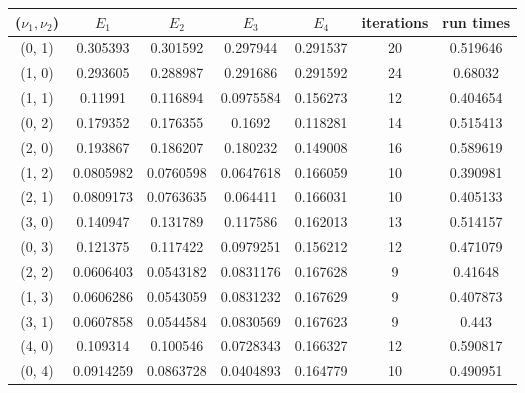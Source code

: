 \documentclass[12pt]{article}
\begin{document}
\begin{center}
\begin{tabular}{||c|cccc|c | c||}
\hline \hline
 ($\nu_1, \nu_2$)   & $E_1$ & $E_2$ &  $E_3$ & $E_4$ &   iterations & run times\\
\hline \hline
  \color{red}(0, 1)   &   \color{red}0.305393  &  \color{red}0.301592  &  \color{red}0.297944  &   \color{red}0.291537 &   \color{red}20 & \color{red}0.519646\\
 (1, 0)   &  0.293605  &      0.288987  &      0.291686  &       0.291592 &           24 & 0.68032 \\ \hline
  \color{red}(1, 1)   &   \color{red}0.11991   &  \color{red}0.116894  &  \color{red}0.0975584 &  \color{red}0.156273 &  \color{red}12 & \color{red}0.404654\\
 (0, 2)   &  0.179352  &      0.176355  &      0.1692    &       0.118281 &           14 & 0.515413 \\ 
 (2, 0)   &  0.193867  &      0.186207  &      0.180232  &       0.149008 &           16 & 0.589619 \\ \hline
  \color{red}(1, 2)   &   \color{red}0.0805982 &       \color{red}0.0760598 &      0.0647618 &       0.166059 &    \color{red}10 & \color{red}0.390981\\
  \color{red}(2, 1)   &  0.0809173 &      0.0763635 &       \color{red}0.064411  &        \color{red}0.166031 &   \color{red}10 & 0.405133 \\
 (3, 0)   &  0.140947  &      0.131789  &      0.117586  &       0.162013 &           13 & 0.514157 \\
 (0, 3)   &  0.121375  &      0.117422  &      0.0979251 &       0.156212 &           12 & 0.471079 \\ \hline
  \color{red}(2, 2)   &  0.0606403 &      0.0543182 &  0.0831176 &       0.167628 &  \color{red}9 & 0.41648  \\
  \color{red}(1, 3)   &  \color{red}0.0606286 &  \color{red}0.0543059 &      0.0831232 &       0.167629 &  \color{red}9  & \color{red}0.407873\\
  \color{red}(3, 1)   &  0.0607858 &      0.0544584 &   \color{red}0.0830569 &     \color{red}0.167623 &   \color{red}9  & 0.443\\
 (4, 0)   &  0.109314  &      0.100546  &      0.0728343 &       0.166327 &           12 &0.590817 \\
 (0, 4)   &  0.0914259 &      0.0863728 &      0.0404893 &       0.164779 &           10 & 0.490951\\
\hline \hline
\end{tabular}
\end{center}
\end{document}

